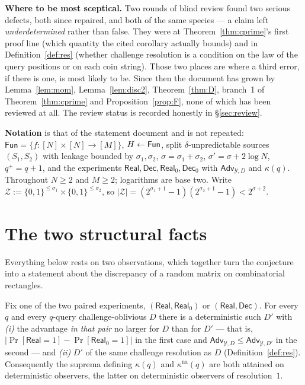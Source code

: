 \documentclass{aicr-solution}
\newcommand{\Fun}{\mathsf{Fun}}
\newcommand{\Adv}{\mathsf{Adv}}
\newcommand{\Real}{\mathsf{Real}}
\newcommand{\Dec}{\mathsf{Dec}}
\newcommand{\Prob}[1]{\Pr\!\left[#1\right]}
\newcommand{\bits}{\{0,1\}}
\newcommand{\kna}{\kappa^{\mathrm{na}}}
\begin{document}
\noindent\textbf{Where to be most sceptical.} Two rounds of blind review found
two serious defects, both since repaired, and both of the same species --- a
claim left \emph{underdetermined} rather than false. They were at
Theorem~\ref{thm:cprime}'s first proof line (which quantity the cited corollary
actually bounds) and in Definition~\ref{def:res} (whether challenge resolution is
a condition on the law of the query positions or on each coin string). Those two
places are where a third error, if there is one, is most likely to be. Since then
the document has grown by Lemma~\ref{lem:mom}, Lemma~\ref{lem:disc2},
Theorem~\ref{thm:D}, branch~1 of Theorem~\ref{thm:cprime} and
Proposition~\ref{prop:F}, none of which has been reviewed at all. The review
status is recorded honestly in \S\ref{sec:review}.

\medskip

\noindent\textbf{Notation} is that of the statement document and is not repeated:
$\Fun=\{f:[N]\times[N]\to[M]\}$, $H\sample\Fun$, split $\delta$-unpredictable
sources $(S_1,S_2)$ with leakage bounded by $\sigma_1,\sigma_2$,
$\sigma=\sigma_1+\sigma_2$, $\sigma'=\sigma+2\log N$, $q^{+}=q+1$, and the
experiments $\Real,\Dec,\Real_0,\Dec_0$ with $\Adv_{\mathcal Y,D}$ and
$\kappa(q)$. Throughout $N\ge2$ and $M\ge2$; logarithms are base two. Write
$\mathcal Z:=\bits^{\le\sigma_1}\times\bits^{\le\sigma_2}$, so
$|\mathcal Z|=(2^{\sigma_1+1}-1)(2^{\sigma_2+1}-1)<2^{\sigma+2}$.

\section{The two structural facts}

Everything below rests on two observations, which together turn the conjecture
into a statement about the discrepancy of a random matrix on combinatorial
rectangles.

\begin{lemma}[derandomisation]\label{lem:derand}
Fix one of the two paired experiments, $(\Real,\Real_0)$ or $(\Real,\Dec)$. For
every $q$ and every $q$-query challenge-oblivious $D$ there is a deterministic
such $D'$ with \emph{(i)} the advantage \emph{in that pair} no larger for $D$ than
for $D'$ --- that is, $\bigl|\Prob{\Real=1}-\Prob{\Real_0=1}\bigr|$ in the first
case and $\Adv_{\mathcal Y,D}\le\Adv_{\mathcal Y,D'}$ in the second --- and
\emph{(ii)} $D'$ of the same challenge resolution as $D$
(Definition~\ref{def:res}). Consequently the suprema defining $\kappa(q)$ and
$\kna(q)$ are both attained on deterministic observers, the latter on
deterministic observers of resolution~$1$.
\end{lemma}
\end{document}
